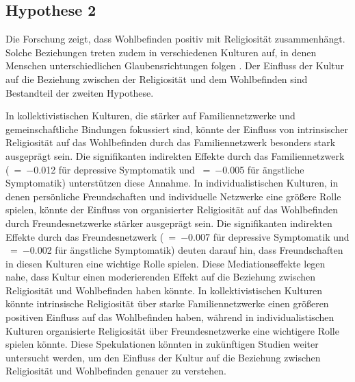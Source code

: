 \subsection{Hypothese 2}    \label{subsec_2.2.2}

Die Forschung zeigt, dass Wohlbefinden positiv mit Religiosität zusammenhängt. Solche Beziehungen treten zudem in verschiedenen Kulturen auf, in denen Menschen unterschiedlichen Glaubensrichtungen folgen \parencite{GrahamCrown2014, TayLiMyersDiener2014}. Der Einfluss der Kultur auf die Beziehung zwischen der Religiosität und dem Wohlbefinden sind Bestandteil der zweiten Hypothese.

In kollektivistischen Kulturen, die stärker auf Familiennetzwerke und gemeinschaftliche Bindungen fokussiert sind, könnte der Einfluss von intrinsischer Religiosität auf das Wohlbefinden durch das Familiennetzwerk besonders stark ausgeprägt sein. Die signifikanten indirekten Effekte durch das Familiennetzwerk (\textbeta~=~$-$0.012 für depressive Symptomatik und \textbeta~=~$-$0.005 für ängstliche Symptomatik) unterstützen diese Annahme.
In individualistischen Kulturen, in denen persönliche Freundschaften und individuelle Netzwerke eine größere Rolle spielen, könnte der Einfluss von organisierter Religiosität auf das Wohlbefinden durch Freundesnetzwerke stärker ausgeprägt sein. Die signifikanten indirekten Effekte durch das Freundesnetzwerk (\textbeta~=~$-$0.007 für depressive Symptomatik und \textbeta~=~$-$0.002 für ängstliche Symptomatik) deuten darauf hin, dass Freundschaften in diesen Kulturen eine wichtige Rolle spielen.
Diese Mediationseffekte legen nahe, dass Kultur einen moderierenden Effekt auf die Beziehung zwischen Religiosität und Wohlbefinden haben könnte. In kollektivistischen Kulturen könnte intrinsische Religiosität über starke Familiennetzwerke einen größeren positiven Einfluss auf das Wohlbefinden haben, während in individualistischen Kulturen organisierte Religiosität über Freundesnetzwerke eine wichtigere Rolle spielen könnte. Diese Spekulationen könnten in zukünftigen Studien weiter untersucht werden, um den Einfluss der Kultur auf die Beziehung zwischen Religiosität und Wohlbefinden genauer zu verstehen. \parencite{FernándezRosell2022}

